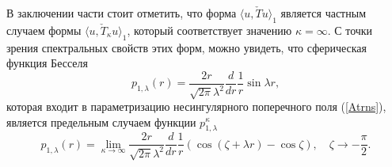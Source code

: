 \documentclass[12pt]{article}
\begin{document}
    В заключении части стоит отметить, что форма
$ \langle u, \check{T} u\rangle_{1} $
    является частным случаем формы
$ \langle u, \check{T}_{\kappa} u\rangle_{1} $,
    который соответствует значению
$ \kappa = \infty $.
    С точки зрения спектральных свойств этих форм, можно увидеть, что
    сферическая функция Бесселя
\begin{equation*}
    p_{1,\lambda}(r) = \frac{2r}{\sqrt{2\pi}\lambda^{2}}
	\frac{d}{dr}\frac{1}{r} \sin \lambda r ,
\end{equation*}
    которая входит в параметризацию несингулярного поперечного поля
(\ref{Atrns}),
    является предельным случаем функции
$ p_{1,\lambda}^{\kappa} $
\begin{equation*}
    p_{1,\lambda}(r)  
        = \lim_{\kappa\to\infty}
    \frac{2r}{\sqrt{2\pi}\lambda^{2}} \frac{d}{dr}\frac{1}{r}
    (\cos(\zeta +\lambda r) - \cos\zeta) ,\quad \zeta\to -\frac{\pi}{2}.
\end{equation*}
\end{document}
